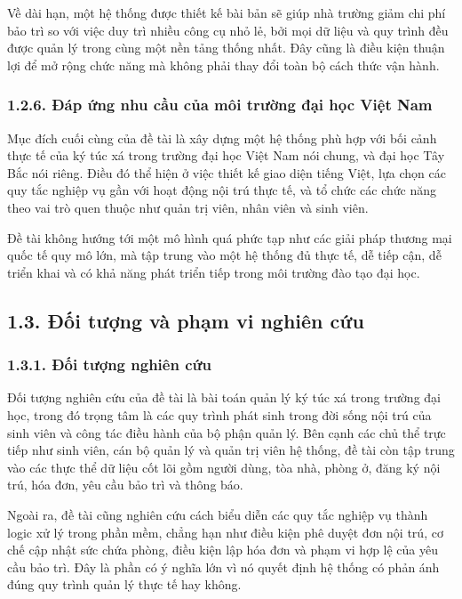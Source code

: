 \documentclass[12pt]{article}
\begin{document}
Về dài hạn, một hệ thống được thiết kế bài bản sẽ giúp nhà trường giảm chi phí bảo trì so với việc duy trì nhiều công cụ nhỏ lẻ, bởi mọi dữ liệu và quy trình đều được quản lý trong cùng một nền tảng thống nhất. Đây cũng là điều kiện thuận lợi để mở rộng chức năng mà không phải thay đổi toàn bộ cách thức vận hành.

\subsubsection*{1.2.6. Đáp ứng nhu cầu của môi trường đại học Việt Nam}

Mục đích cuối cùng của đề tài là xây dựng một hệ thống phù hợp với bối cảnh thực tế của ký túc xá trong trường đại học Việt Nam nói chung, và đại học Tây Bắc nói riêng. Điều đó thể hiện ở việc thiết kế giao diện tiếng Việt, lựa chọn các quy tắc nghiệp vụ gần với hoạt động nội trú thực tế, và tổ chức các chức năng theo vai trò quen thuộc như quản trị viên, nhân viên và sinh viên.

Đề tài không hướng tới một mô hình quá phức tạp như các giải pháp thương mại quốc tế quy mô lớn, mà tập trung vào một hệ thống đủ thực tế, dễ tiếp cận, dễ triển khai và có khả năng phát triển tiếp trong môi trường đào tạo đại học.

\subsection*{1.3. Đối tượng và phạm vi nghiên cứu}

\subsubsection*{1.3.1. Đối tượng nghiên cứu}

Đối tượng nghiên cứu của đề tài là bài toán quản lý ký túc xá trong trường đại học, trong đó trọng tâm là các quy trình phát sinh trong đời sống nội trú của sinh viên và công tác điều hành của bộ phận quản lý. Bên cạnh các chủ thể trực tiếp như sinh viên, cán bộ quản lý và quản trị viên hệ thống, đề tài còn tập trung vào các thực thể dữ liệu cốt lõi gồm người dùng, tòa nhà, phòng ở, đăng ký nội trú, hóa đơn, yêu cầu bảo trì và thông báo.

Ngoài ra, đề tài cũng nghiên cứu cách biểu diễn các quy tắc nghiệp vụ thành logic xử lý trong phần mềm, chẳng hạn như điều kiện phê duyệt đơn nội trú, cơ chế cập nhật sức chứa phòng, điều kiện lập hóa đơn và phạm vi hợp lệ của yêu cầu bảo trì. Đây là phần có ý nghĩa lớn vì nó quyết định hệ thống có phản ánh đúng quy trình quản lý thực tế hay không.
\end{document}
